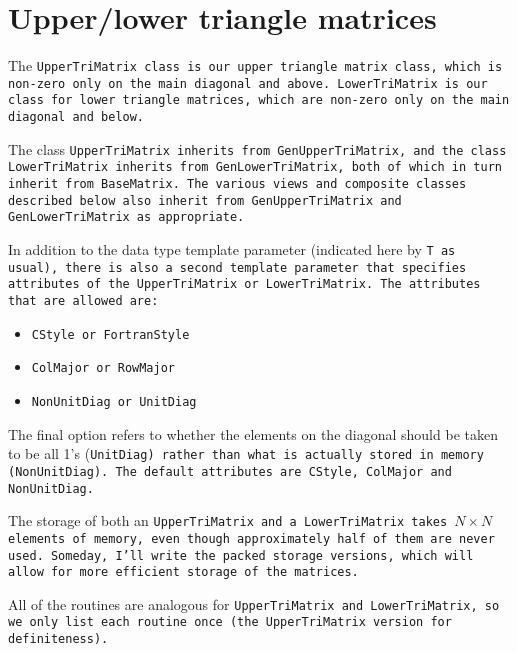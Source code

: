 
\section{Upper/lower triangle matrices}
\label{TriMatrix}

The \tt{UpperTriMatrix} class is our upper triangle matrix class, which is non-zero
only on the main diagonal and above.  \tt{LowerTriMatrix} is our class for lower
triangle matrices, which are non-zero only on the main diagonal and below.

The class \tt{UpperTriMatrix} inherits from \tt{GenUpperTriMatrix}, 
and the class \tt{LowerTriMatrix}
inherits from \tt{GenLowerTriMatrix}, both of
which in turn inherit from \tt{BaseMatrix}.  
The various views and composite classes described below
also inherit from \tt{GenUpperTriMatrix} and \tt{GenLowerTriMatrix} 
as appropriate.

In addition to the data type template parameter (indicated here by \tt{T} as usual),
there is also a second template parameter that specifies attributes of the
\tt{UpperTriMatrix} or \tt{LowerTriMatrix}.  The attributes that are allowed are:
\begin{itemize}
\item \tt{CStyle} or \tt{FortranStyle}
\item \tt{ColMajor} or \tt{RowMajor}
\item \tt{NonUnitDiag} or \tt{UnitDiag}
\end{itemize}
The final option refers to whether the elements on the diagonal should be 
taken to be all 1's (\tt{UnitDiag}) rather than what is actually stored 
in memory (\tt{NonUnitDiag}).
The default attributes are \tt{CStyle}, \tt{ColMajor} and \tt{NonUnitDiag}.

The storage of both an \tt{UpperTriMatrix} and a \tt{LowerTriMatrix} takes
$N \times N$ elements of memory, even though approximately half of them 
are never used.  Someday, I'll write the packed storage versions, which will
allow for more efficient storage of the matrices.

All of the routines are analogous for \tt{UpperTriMatrix} and 
\tt{LowerTriMatrix}, so we only list each routine once 
(the \tt{UpperTriMatrix} version for definiteness).  

